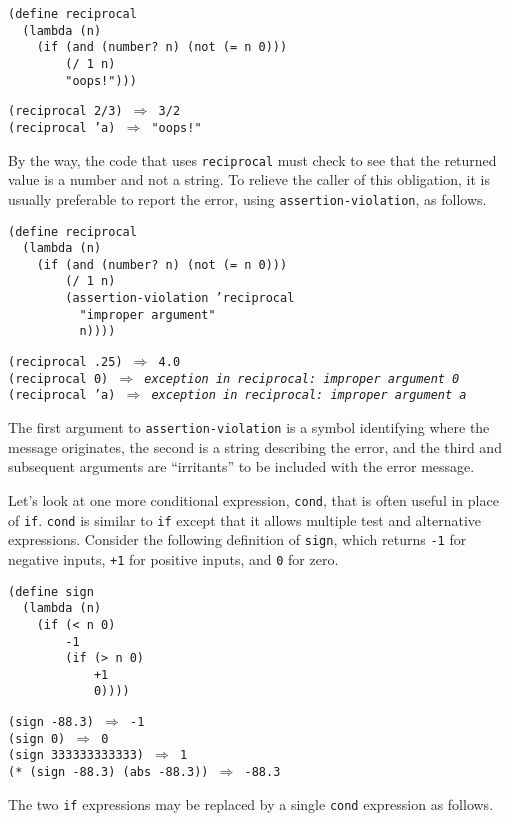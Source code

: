 \begin{alltt}
(define reciprocal
  (lambda (n)
    (if (and (number? n) (not (= n 0)))
        (/ 1 n)
        "oops!")))

(reciprocal 2/3) \(\Rightarrow\) 3/2
(reciprocal 'a) \(\Rightarrow\) "oops!"
\end{alltt}


By the way, the code that uses \texttt{reciprocal} must check to see that
the returned value is a number and not a string.
To relieve the caller of this obligation, it is usually preferable
to report the error, using \texttt{assertion-violation},
as follows.


\begin{alltt}
(define reciprocal
  (lambda (n)
    (if (and (number? n) (not (= n 0)))
        (/ 1 n)
        (assertion-violation 'reciprocal
          "improper argument"
          n))))

(reciprocal .25) \(\Rightarrow\) 4.0
(reciprocal 0) \(\Rightarrow\) \textit{exception in reciprocal: improper argument 0}
(reciprocal 'a) \(\Rightarrow\) \textit{exception in reciprocal: improper argument a}
\end{alltt}


The first argument to \texttt{assertion-violation} is a symbol identifying where
the message originates, the second is a string describing the error,
and the third and subsequent arguments are ``irritants'' to be included with
the error message.


Let's look at one more conditional expression, \label{start_s124}\texttt{cond}, that is often
useful in place of \label{start_s125}\texttt{if}.
\texttt{cond} is similar to \texttt{if} except that it allows multiple
test and alternative expressions.
Consider the following definition of \texttt{sign}, which returns
\texttt{-1} for negative inputs,
\texttt{+1} for positive inputs, and
\texttt{0} for zero.


\begin{alltt}
(define sign
  (lambda (n)
    (if (\textless{} n 0)
        -1
        (if (\textgreater{} n 0)
            +1
            0))))
\end{alltt}


\begin{alltt}
(sign -88.3) \(\Rightarrow\) -1
(sign 0) \(\Rightarrow\) 0
(sign 333333333333) \(\Rightarrow\) 1
(* (sign -88.3) (abs -88.3)) \(\Rightarrow\) -88.3
\end{alltt}


The two \texttt{if} expressions may be replaced by a single \texttt{cond}
expression as follows.


